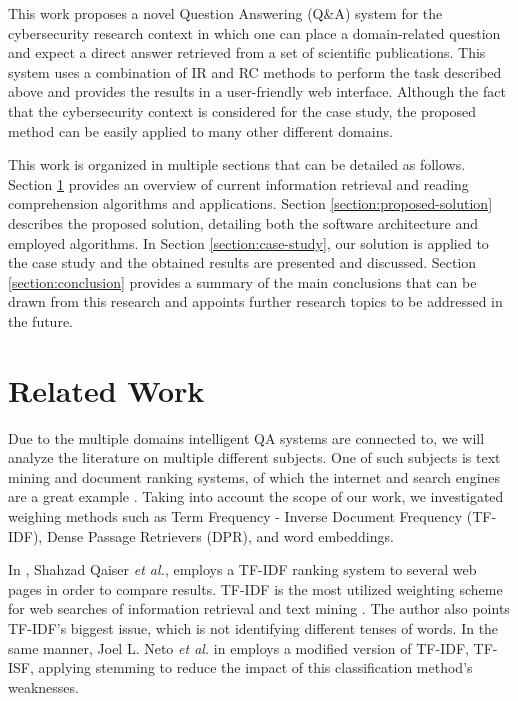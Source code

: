 \documentclass[runningheads]{llncs}
\begin{document}
This work proposes a novel Question Answering (Q\&A) system for the cybersecurity research context in which one can place a domain-related question and expect a direct answer retrieved from a set of scientific publications. This system uses a combination of IR and RC methods to perform the task described above and provides the results in a user-friendly web interface.  Although the fact that the cybersecurity context is considered for the case study, the proposed method can be easily applied to many other different domains.

This work is organized in multiple sections that can be detailed as follows. Section \ref{section:related-work} provides an overview of current information retrieval and reading comprehension algorithms and applications. Section \ref{section:proposed-solution} describes the proposed solution, detailing both the software architecture and employed algorithms. In Section \ref{section:case-study}, our solution is applied to the case study and the obtained results are presented and discussed. Section \ref{section:conclusion} provides a summary of the main conclusions that can be drawn from this research and appoints further research topics to be addressed in the future.

\section{Related Work}
\label{section:related-work}
Due to the multiple domains intelligent QA systems are connected to, we will analyze the literature on multiple different subjects.
One of such subjects is text mining and document ranking systems, of which the internet and search engines are a great example \cite{singh2009comparative}. 
Taking into account the scope of our work, we investigated weighing methods such as Term Frequency - Inverse Document Frequency (TF-IDF), Dense Passage Retrievers (DPR), and word embeddings.

In \cite{qaiser2018text}, Shahzad Qaiser \textit{et al.}, employs a TF-IDF ranking system to several web pages in order to compare results. TF-IDF is the most utilized weighting scheme for web searches of information retrieval and text mining \cite{Beel2016}. The author also points TF-IDF's biggest issue, which is not identifying different tenses of words. In the same manner, Joel L. Neto \textit{et al.} in \cite{neto2000document} employs a modified version of TF-IDF, TF-ISF, applying stemming to reduce the impact of this classification method's weaknesses.
\end{document}
